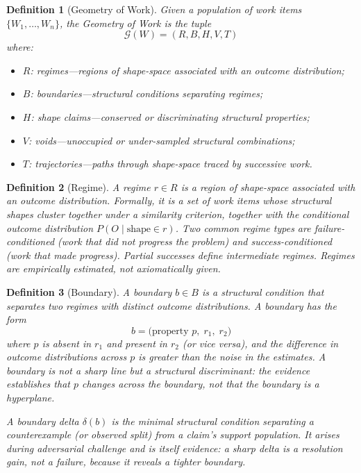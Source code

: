 \documentclass[11pt]{article}
\theoremstyle{gowthm}
\newtheorem{definition}{Definition}[section]
\theoremstyle{gowplain}
\begin{document}
\begin{definition}[Geometry of Work]
Given a population of work items $\{W_1, \ldots, W_n\}$, the \emph{Geometry
of Work} is the tuple
\[
\mathcal{G}(W) = (R, B, H, V, T)
\]
where:
\begin{itemize}[nosep]
  \item $R$: regimes---regions of shape-space associated with an outcome
    distribution;
  \item $B$: boundaries---structural conditions separating regimes;
  \item $H$: shape claims---conserved or discriminating structural properties;
  \item $V$: voids---unoccupied or under-sampled structural combinations;
  \item $T$: trajectories---paths through shape-space traced by successive work.
\end{itemize}
\end{definition}

\begin{definition}[Regime]
A \emph{regime} $r \in R$ is a region of shape-space associated with an
outcome distribution. Formally, it is a set of work items whose structural
shapes cluster together under a similarity criterion, together with the
conditional outcome distribution $P(O \mid \text{shape} \in r)$. Two common
regime types are \emph{failure-conditioned} (work that did not progress the
problem) and \emph{success-conditioned} (work that made progress). Partial
successes define intermediate regimes. Regimes are empirically estimated, not
axiomatically given.
\end{definition}

\begin{definition}[Boundary]
A \emph{boundary} $b \in B$ is a structural condition that separates two
regimes with distinct outcome distributions. A boundary has the form
\[
b = \bigl(\text{property } p,\; r_1,\; r_2 \bigr)
\]
where $p$ is absent in $r_1$ and present in $r_2$ (or vice versa), and the
difference in outcome distributions across $p$ is greater than the noise in
the estimates. A boundary is not a sharp line but a structural discriminant:
the evidence establishes that $p$ changes across the boundary, not that
the boundary is a hyperplane.

A \emph{boundary delta} $\delta(b)$ is the minimal structural condition
separating a counterexample (or observed split) from a claim's support
population. It arises during adversarial challenge and is itself evidence:
a sharp delta is a \emph{resolution gain}, not a failure, because it reveals
a tighter boundary.
\end{definition}
\end{document}
